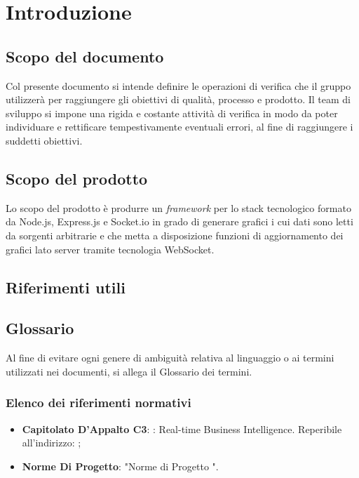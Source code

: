 
\section{Introduzione}
	\subsection{Scopo del documento}
		Col presente documento si intende definire le operazioni di verifica che il gruppo \groupname utilizzerà per raggiungere gli obiettivi di qualità, processo e prodotto. Il team di sviluppo si impone una rigida e costante attività di verifica in modo da poter individuare e rettificare tempestivamente eventuali errori, al fine di raggiungere i suddetti obiettivi. 
	\subsection{Scopo del prodotto}
		Lo scopo del prodotto è produrre un \textit{framework} per lo stack tecnologico formato da Node.js, Express.js e Socket.io in grado di generare grafici i cui dati sono letti da sorgenti arbitrarie e che metta a disposizione funzioni di aggiornamento dei grafici lato server tramite tecnologia WebSocket.
	\subsection{Riferimenti utili}
		\subsection{Glossario}
			Al fine di evitare ogni genere di ambiguità relativa al linguaggio o ai termini utilizzati nei documenti, si allega il Glossario dei termini.
		\subsubsection{Elenco dei riferimenti normativi}
			\begin{itemize}
				\item \textbf{Capitolato D'Appalto C3}: \projectname: Real-time Business Intelligence. Reperibile all'indirizzo: ;
				\item \textbf{Norme Di Progetto}: "Norme di Progetto \lastversion".
			\end{itemize}
